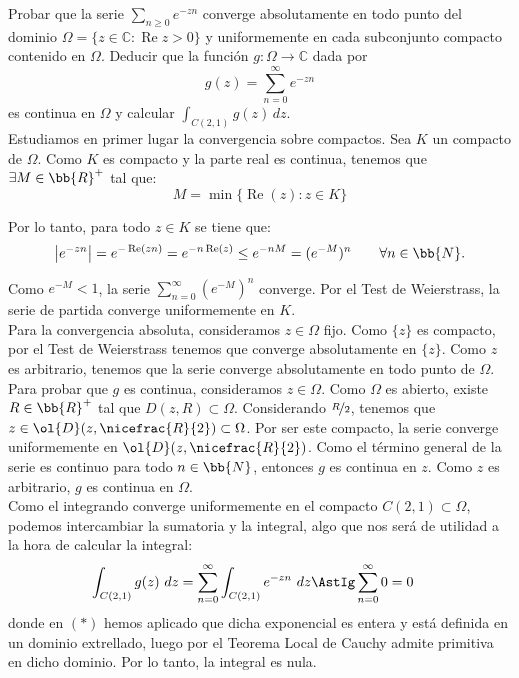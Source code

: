 \documentclass[12pt]{article}
\renewcommand{\Re}{\operatorname{Re}} %
\begin{document}
    \newpage
    \setcounter{ejercicio}{0}


    \begin{ejercicio}[3.5 puntos]
        Probar que la serie $\sum\limits_{n \geq 0} e^{-zn}$ converge absolutamente en todo punto del dominio $\Omega = \{z \in \mathbb{C} : \Re z > 0\}$ y uniformemente en cada subconjunto compacto contenido en $\Omega$. Deducir que la función $g : \Omega \to \mathbb{C}$ dada por
        \[
            g(z) = \sum\limits_{n=0}^{\infty} e^{-zn}
        \]
        es continua en $\Omega$ y calcular $\displaystyle \int_{C(2,1)} g(z) \, dz$.\\

        Estudiamos en primer lugar la convergencia sobre compactos. Sea $K$ un compacto de $\Omega$. Como $K$ es compacto y la parte real es continua, tenemos que $\exists M\in \bb{R}^+$ tal que:
        \begin{equation*}
            M=\min\{\Re(z) : z \in K\}
        \end{equation*}
        
        Por lo tanto, para todo $z \in K$ se tiene que:
        \begin{equation*}
            \left|e^{-zn}\right| = e^{-\Re(zn)} = e^{-n\Re(z)} \leq e^{-nM} = (e^{-M})^n \qquad \forall n \in \bb{N}.
        \end{equation*}

        Como $e^{-M} < 1$, la serie $\sum\limits_{n=0}^{\infty} (e^{-M})^n$ converge. Por el Test de Weierstrass, la serie de partida converge uniformemente en $K$.\\

        Para la convergencia absoluta, consideramos $z\in \Omega$ fijo. Como $\{z\}$ es compacto, por el Test de Weierstrass tenemos que converge absolutamente en $\{z\}$. Como $z$ es arbitrario, tenemos que la serie converge absolutamente en todo punto de $\Omega$.\\

        Para probar que $g$ es continua, consideramos $z\in \Omega$. Como $\Omega$ es abierto, existe $R\in \bb{R}^+$ tal que $D(z,R)\subset \Omega$. Considerando $\nicefrac{R}{2}$, tenemos que $z\in \ol{D}(z,\nicefrac{R}{2})\subset \Omega$. Por ser este compacto, la serie converge uniformemente en $\ol{D}(z,\nicefrac{R}{2})$. Como el término general de la serie es continuo para todo $n\in \bb{N}$, entonces $g$ es continua en $z$. Como $z$ es arbitrario, $g$ es continua en $\Omega$.\\

        Como el integrando converge uniformemente en el compacto $C(2,1)\subset \Omega$, podemos intercambiar la sumatoria y la integral, algo que nos será de utilidad a la hora de calcular la integral:
        \begin{align*}
            \int_{C(2,1)} g(z)\ dz &= \sum_{n=0}^{\infty} \int_{C(2,1)} e^{-zn}\ dz \AstIg \sum_{n=0}^{\infty} 0 = 0
        \end{align*}
        donde en $(\ast)$ hemos aplicado que dicha exponencial es entera y está definida en un dominio extrellado, luego por el Teorema Local de Cauchy admite primitiva en dicho dominio. Por lo tanto, la integral es nula.
    \end{ejercicio}
\end{document}
